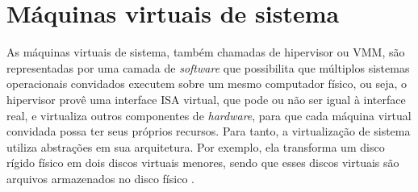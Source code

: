 
\section{Máquinas virtuais de sistema}
\label{section:virtsistema}

As máquinas virtuais de sistema, também chamadas de hipervisor ou \ac{VMM}, são representadas por uma camada de \textit{software} que possibilita
que múltiplos sistemas operacionais convidados executem sobre um mesmo computador físico, ou seja, o hipervisor provê uma interface
\ac{ISA} virtual, que pode ou não ser igual à interface real, e virtualiza outros componentes de \textit{hardware}, para que cada máquina
virtual convidada possa ter seus próprios recursos. Para tanto, a virtualização de sistema utiliza abstrações em sua arquitetura. 
Por exemplo, ela transforma um disco rígido físico em dois discos virtuais menores, sendo que esses discos virtuais são arquivos armazenados no 
disco físico \cite{smithenair2005}.


